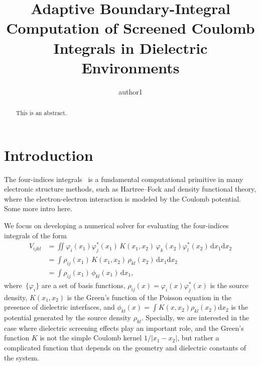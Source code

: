 \documentclass[preprint,12pt]{elsarticle}
\newcommand{\abs}[1]{\left|#1\right|}
\begin{document}
\begin{frontmatter}

\title{Adaptive Boundary-Integral Computation of Screened Coulomb Integrals in Dielectric Environments}

\author[aff1]{author1}

\address[aff1]{aff1}

\begin{abstract}
This is an abstract.
\end{abstract}

\begin{keyword}
\end{keyword}

\end{frontmatter}

\section{Introduction}

The four-indices integrals~\cite{cramer2013essentials} is a fundamental computational primitive in many electronic structure methods, such as Hartree--Fock and density functional theory, where the electron-electron interaction is modeled by the Coulomb potential.
Some more intro here.

We focus on developing a numerical solver for evaluating the four-indices integrals of the form
\begin{equation}\label{eq:four_indices}
    \begin{split}
    V_{ijkl} &= \iint \varphi_i(x_1)\varphi_j^*(x_1)\, K(x_1,x_2)\,
        \varphi_k(x_2)\varphi_l^*(x_2)\, \mathrm{d}x_1\mathrm{d}x_2\\
    &= \int \rho_{ij}(x_1)\, K(x_1,x_2)\, \rho_{kl}(x_2)\, \mathrm{d}x_1\mathrm{d}x_2\\
    &= \int \rho_{ij}(x_1)\, \phi_{kl}(x_1)\, \mathrm{d}x_1,
    \end{split}
\end{equation}
where~$\{\varphi_i\}$ are a set of basis functions, $\rho_{ij}(x) = \varphi_i(x)\varphi_j^*(x)$ is the source density, $K(x_1,x_2)$ is the Green's function of the Poisson equation in the presence of dielectric interfaces, and $\phi_{kl}(x) = \int K(x,x_2)\rho_{kl}(x_2)\mathrm{d}x_2$ is the potential generated by the source density $\rho_{kl}$.
Specially, we are interested in the case where dielectric screening effects play an important role, and the Green's function $K$ is not the simple Coulomb kernel $1/\abs{x_1-x_2}$, but rather a complicated function that depends on the geometry and dielectric constants of the system.
\end{document}
